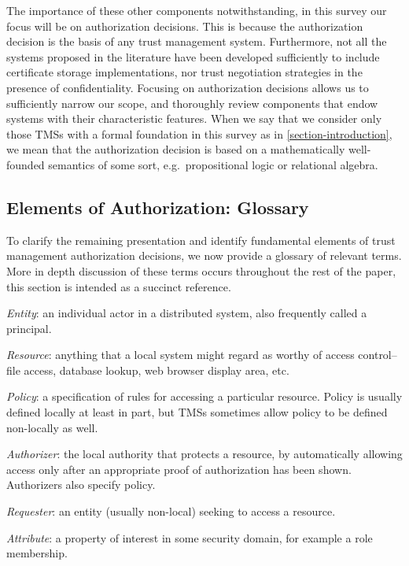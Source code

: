 The importance of these other components notwithstanding, in this
survey our focus will be on authorization decisions.  This is because
the authorization decision is the basis of any trust management
system.  Furthermore, not all the systems proposed in the literature
have been developed sufficiently to include certificate storage
implementations, nor trust negotiation strategies in the presence of
confidentiality.  Focusing on authorization decisions allows us to
sufficiently narrow our scope, and thoroughly review components that
endow systems with their characteristic features.  When we say that we
consider only those TMSs with a formal foundation in this survey as in
\autoref{section-introduction}, we mean that the authorization
decision is based on a mathematically well-founded semantics of some
sort, e.g.~propositional logic or relational algebra.

\subsection{Elements of Authorization: Glossary}

To clarify the remaining presentation and identify fundamental
elements of trust management authorization decisions, we now provide a
glossary of relevant terms.  More in depth discussion of these terms
occurs throughout the rest of the paper, this section is intended as a
succinct reference.

\medskip\emph{Entity}: an individual actor in a distributed system, also
frequently called a principal.

\medskip\emph{Resource}: anything that a local system might regard as
worthy of access control-- file access, database lookup, web browser
display area, etc.

\medskip\emph{Policy}: a specification of rules for accessing a particular
resource.  Policy is usually defined locally at least in part, but
TMSs sometimes allow policy to be defined
non-locally as well.

\medskip\emph{Authorizer}: the local authority that protects a
resource, by automatically allowing access only after an
appropriate proof of authorization has been shown.  Authorizers 
also specify policy.

\medskip\emph{Requester}: an entity (usually non-local) seeking to access a
resource.

\medskip\emph{Attribute}: a property of interest in some security 
domain, for example a role membership.

